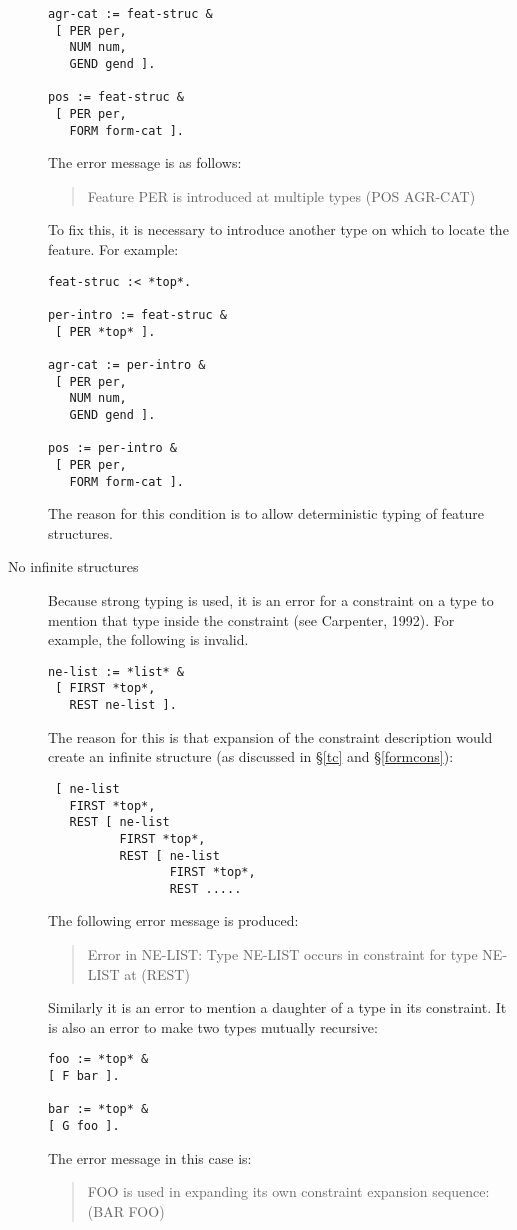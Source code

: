 \documentclass[12pt]{report}
\newenvironment{error}%
{\begin{quote}
\tt
}%
{\end{quote}
}
\begin{document}
\begin{description}
\begin{verbatim}
agr-cat := feat-struc &
 [ PER per,
   NUM num,
   GEND gend ].

pos := feat-struc &
 [ PER per,
   FORM form-cat ].
\end{verbatim}
The error message is as follows:
\begin{error}
Feature PER is introduced at multiple types (POS AGR-CAT)
\end{error} 
To fix this, it is necessary to introduce another type on which to
locate the feature.  For example:
\begin{verbatim}
feat-struc :< *top*.

per-intro := feat-struc &
 [ PER *top* ].

agr-cat := per-intro &
 [ PER per,
   NUM num,
   GEND gend ].

pos := per-intro &
 [ PER per,
   FORM form-cat ].
\end{verbatim}

The reason for this condition is to allow deterministic 
typing of feature structures.                      
\item[No infinite structures]
Because strong typing is used, it is an error for a constraint on a type
to mention that type inside the constraint (see Carpenter, 1992).  
For example, the following is
invalid.
\begin{verbatim}
ne-list := *list* &
 [ FIRST *top*,
   REST ne-list ].
\end{verbatim}
The reason for this is that expansion of the constraint description
would create an infinite 
structure (as discussed in \S\ref{tc} and \S\ref{formcons}):
\begin{verbatim}
 [ ne-list
   FIRST *top*,
   REST [ ne-list
          FIRST *top*,
          REST [ ne-list
                 FIRST *top*,
                 REST .....
\end{verbatim}
The following error message is produced:
\begin{error}
Error in NE-LIST: 
  Type NE-LIST occurs in constraint for type NE-LIST at (REST)
\end{error}
Similarly it is an error to mention a daughter of a type in its
constraint.  It is also an error to make two types mutually
recursive:
\begin{verbatim}
foo := *top* &
[ F bar ].

bar := *top* &
[ G foo ].
\end{verbatim}
The error message in this case is:
\begin{error}
FOO is used in expanding its own constraint 
                    expansion sequence: (BAR FOO)
\end{error}



\end{description}
\end{document}
